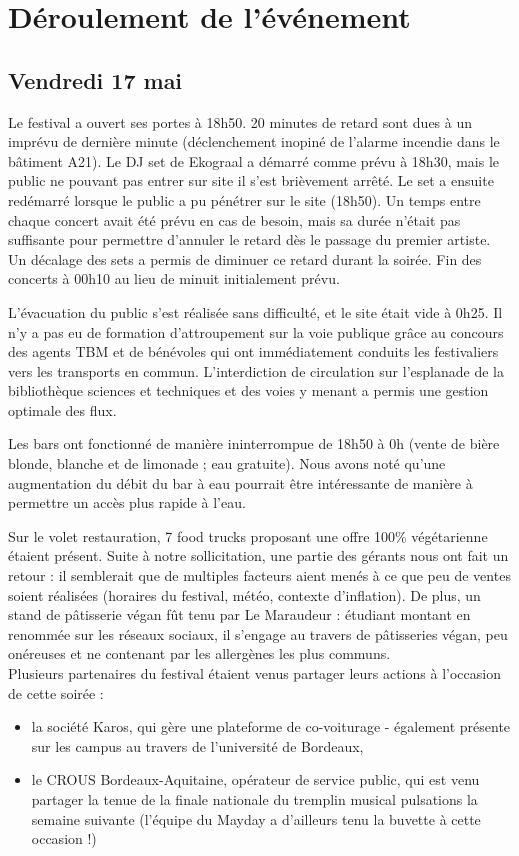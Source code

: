 \documentclass[12pt,a4paper]{report}
\begin{document}
\chapter{Déroulement de l'événement}

\section{Vendredi 17 mai}

Le festival a ouvert ses portes à 18h50. 20 minutes de retard sont dues à un imprévu de dernière minute (déclenchement inopiné de l'alarme incendie dans le bâtiment A21). Le DJ set de Ekograal a démarré comme prévu à 18h30, mais le public ne pouvant pas entrer sur site il s'est brièvement arrêté. Le set a ensuite redémarré lorsque le public a pu pénétrer sur le site (18h50). Un temps entre chaque concert avait été prévu en cas de besoin, mais sa durée n'était pas suffisante pour permettre d'annuler le retard dès le passage du premier artiste. Un décalage des sets a permis de diminuer ce retard durant la soirée. Fin des concerts à 00h10 au lieu de minuit initialement prévu.

L'évacuation du public s'est réalisée sans difficulté, et le site était vide à 0h25. Il n'y a pas eu de formation d'attroupement sur la voie publique grâce au concours des agents TBM et de bénévoles qui ont immédiatement conduits les festivaliers vers les transports en commun. L'interdiction de circulation sur l'esplanade de la bibliothèque sciences et techniques et des voies y menant a permis une gestion optimale des flux.

Les bars ont fonctionné de manière ininterrompue de 18h50 à 0h (vente de bière blonde, blanche et de limonade ; eau gratuite). Nous avons noté qu'une augmentation du débit du bar à eau pourrait être intéressante de manière à permettre un accès plus rapide à l'eau.

Sur le volet restauration, 7 food trucks proposant une offre 100\% végétarienne étaient présent. Suite à notre sollicitation, une partie des gérants nous ont fait un retour : il semblerait que de multiples facteurs aient menés à ce que peu de ventes soient réalisées (horaires du festival, météo, contexte d'inflation). De plus, un stand de pâtisserie végan fût tenu par Le Maraudeur : étudiant montant en renommée sur les réseaux sociaux, il s'engage au travers de pâtisseries végan, peu onéreuses et ne contenant par les allergènes les plus communs. \\

Plusieurs partenaires du festival étaient venus partager leurs actions à l'occasion de cette soirée : 
\begin{itemize}
\item la société Karos, qui gère une plateforme de co-voiturage - également présente sur les campus au travers de l'université de Bordeaux,
\item le CROUS Bordeaux-Aquitaine, opérateur de service public, qui est venu partager la tenue de la finale nationale du tremplin musical pulsations la semaine suivante (l'équipe du Mayday a d'ailleurs tenu la buvette à cette occasion !)
\end{itemize}
\end{document}
